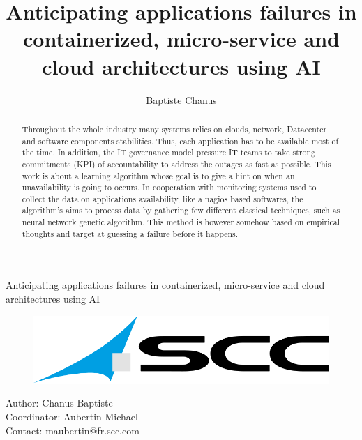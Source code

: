 \documentclass[10pt,a4paper,oneside]{article}
\author{Baptiste Chanus}
\title{Anticipating applications failures in containerized, micro-service and cloud architectures using AI}
\begin{document}
\begin{center}

\vspace{0.8cm}

\begin{Large}
Anticipating applications failures in containerized, micro-service and cloud architectures using AI
\end{Large}
\end{center}

\vspace{0.8cm}

\begin{figure}[h!]
\centering
\includegraphics[scale=0.5]{./images/PNG/scc-logo.png}
\end{figure}

\vspace{0.8cm}

Author: Chanus Baptiste\\
Coordinator: Aubertin Michael\\
Contact: maubertin@fr.scc.com\\

\vspace{0.8cm}

\begin{abstract}
	Throughout the whole industry many systems relies on clouds, network, Datacenter and software components stabilities. Thus, each application has to be available most of the time. In addition, the IT governance model pressure IT teams to take strong commitments (KPI) of accountability to address the outages as fast as possible. This work is about a learning algorithm whose goal is to give a hint on when an unavailability is going to occurs. In cooperation with monitoring systems used to collect the data on applications availability, like a nagios based softwares, the algorithm's aims to process data by gathering few different classical techniques, such as neural network genetic algorithm. This method is however somehow based on empirical thoughts and target at guessing a failure before it happens.
\end{abstract}

\vspace{1.2cm}
\end{document}
